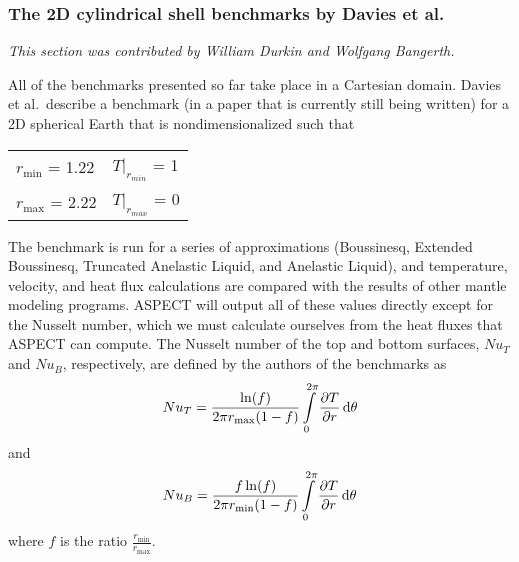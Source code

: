 \documentclass{article}
\newcommand{\aspect}{\textsc{ASPECT}}
\begin{document}
\subsubsection{The 2D cylindrical shell benchmarks by Davies et al.}
\label{sec:benchmark-2D_cylindrical_shell}

\textit{This section was contributed by William Durkin and Wolfgang Bangerth.}

All of the benchmarks presented so far take place in a Cartesian domain. 
Davies et al.~describe a benchmark (in a paper that is currently still being
written) for a 2D spherical Earth that is  
nondimensionalized such that 
\begin{table*}[h]
 \centering
 \begin{tabular}{ l l }
    $r_{\min}$ = 1.22 &  $\left. T \right|_{r_{min}}$ = 1 \\
    $r_{\max}$ = 2.22 &  $\left. T \right|_{r_{max}}$ = 0
 \end{tabular}
\end{table*}

The benchmark is run for a series of approximations (Boussinesq, Extended Boussinesq,
Truncated Anelastic Liquid, and Anelastic Liquid), and temperature, velocity, and heat flux 
calculations are compared with the results of other mantle modeling programs. \aspect{}
will output all of these values directly except for the Nusselt number, which
we must calculate ourselves from the heat fluxes that \aspect{} can compute.
The Nusselt number of the top and bottom surfaces, ${Nu}_T$ and ${Nu}_B$,
respectively, are defined by the authors of the benchmarks as
\begin{equation}
\label{eq:davies-NuTop}
{Nu}_{T} = \frac{\ln(f)}{2{\pi}r_{\max}(1-f)}\int \limits_{0}^{2\pi} \frac{\partial T}{\partial r}\, \text{d}\theta  \\
\end{equation}
and
\begin{equation*}
\label{eq:davies-NuBottom}
{Nu}_{B} = \frac{f \ln(f)}{2{\pi}r_{\min}(1-f)}\int \limits_{0}^{2\pi} \frac{\partial T}{\partial r}\, \text{d}\theta \\
\end{equation*}
where $f$ is the ratio $\frac{r_{\min}}{r_{\max}}$.
\end{document}
